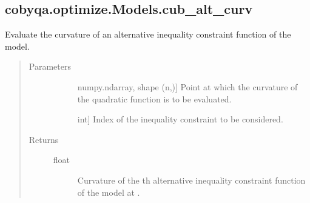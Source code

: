 \documentclass[letterpaper,10pt,english]{sphinxmanual}
\begin{document}
\begin{fulllineitems}
\begin{fulllineitems}
\end{fulllineitems}



\subsection{cobyqa.optimize.Models.cub\_alt\_curv}
\label{\detokenize{refs/generated/cobyqa.optimize.Models.cub_alt_curv:cobyqa-optimize-models-cub-alt-curv}}\label{\detokenize{refs/generated/cobyqa.optimize.Models.cub_alt_curv::doc}}

\begin{fulllineitems}
\label{\detokenize{refs/generated/cobyqa.optimize.Models.cub_alt_curv:cobyqa.optimize.Models.cub_alt_curv}}
\sphinxAtStartPar
Evaluate the curvature of an alternative inequality constraint function
of the model.
\begin{quote}\begin{description}
\item[{Parameters}] \leavevmode\begin{description}
\item[{}] \leavevmode{[}numpy.ndarray, shape (n,){]}
\sphinxAtStartPar
Point at which the curvature of the quadratic function is to be
evaluated.

\item[{}] \leavevmode{[}int{]}
\sphinxAtStartPar
Index of the inequality constraint to be considered.

\end{description}

\item[{Returns}] \leavevmode\begin{description}
\item[{float}] \leavevmode
\sphinxAtStartPar
Curvature of the \sphinxhyphen{}th alternative inequality constraint function
of the model at .

\end{description}

\end{description}\end{quote}

\end{fulllineitems}




\end{fulllineitems}
\end{document}
